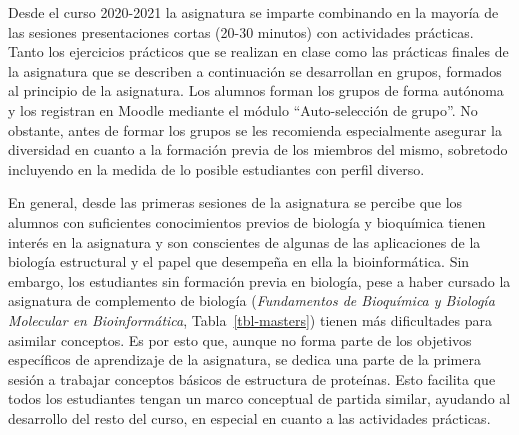 \documentclass[
  11pt,
  a4paper,
  twoside]{scrreprt}
\begin{document}
Desde el curso 2020-2021 la asignatura se imparte combinando en la
mayoría de las sesiones presentaciones cortas (20-30 minutos) con
actividades prácticas. Tanto los ejercicios prácticos que se realizan en
clase como las prácticas finales de la asignatura que se describen a
continuación se desarrollan en grupos, formados al principio de la
asignatura. Los alumnos forman los grupos de forma autónoma y los
registran en Moodle mediante el módulo ``Auto-selección de grupo''. No
obstante, antes de formar los grupos se les recomienda especialmente
asegurar la diversidad en cuanto a la formación previa de los miembros
del mismo, sobretodo incluyendo en la medida de lo posible estudiantes
con perfil diverso.

En general, desde las primeras sesiones de la asignatura se percibe que
los alumnos con suficientes conocimientos previos de biología y
bioquímica tienen interés en la asignatura y son conscientes de algunas
de las aplicaciones de la biología estructural y el papel que desempeña
en ella la bioinformática. Sin embargo, los estudiantes sin formación
previa en biología, pese a haber cursado la asignatura de complemento de
biología (\emph{Fundamentos de Bioquímica y Biología Molecular en
Bioinformática}, Tabla~\ref{tbl-masters}) tienen más dificultades para
asimilar conceptos. Es por esto que, aunque no forma parte de los
objetivos específicos de aprendizaje de la asignatura, se dedica una
parte de la primera sesión a trabajar conceptos básicos de estructura de
proteínas. Esto facilita que todos los estudiantes tengan un marco
conceptual de partida similar, ayudando al desarrollo del resto del
curso, en especial en cuanto a las actividades prácticas.
\end{document}
